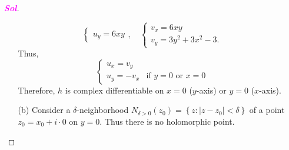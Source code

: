 \documentclass{article}
\theoremstyle{definition}
\newcommand{\set}[1]{\left\{#1\right\}}
\newcommand{\abs}[1]{\left\lvert #1 \right\rvert}
\newcommand{\sol}{\textcolor{magenta}{\bf Sol}}
\begin{document}
\begin{enumerate}
\begin{proof}[\sol]
\begin{itemize}
\[\begin{cases}
				u_y=6xy
				\end{cases},\quad
				\begin{cases}
				v_x=6xy\\
				v_y=3y^2+3x^2-3.
				\end{cases}
				\] Thus, \[\begin{cases}
				u_x=v_y&\\
				u_y=-v_x &\text{if $y=0$ or $x=0$}
				\end{cases}
				\] Therefore, $h$ is complex differentiable on $x=0$ ($y$-axis) or $y=0$ ($x$-axis).
				\vspace{4pt}
				\item[(b)] Consider a $\delta$-neighborhood $N_{\delta>0}(z_0)=\set{z:\abs{z-z_0}<\delta}$ of a point $z_0=x_0+i\cdot 0$ on $y=0$. Thus there is no holomorphic point.
			\end{itemize}
		\end{proof}
		

\end{enumerate}
\end{document}
